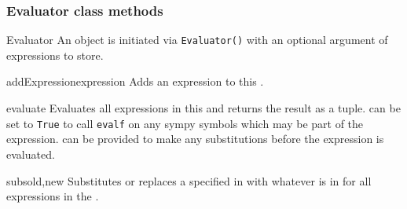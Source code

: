 \subsubsection{Evaluator class methods}
\begin{classdesc}{Evaluator}{}
An \EVALUATOR object is initiated via \texttt{Evaluator()} with an optional
argument of expressions to store.
\end{classdesc}
\begin{methoddesc}[Evaluator]{addExpression}{expression}
Adds an expression to this \EVALUATOR.
\end{methoddesc}
\begin{methoddesc}[Evaluator]{evaluate}{}
Evaluates all expressions in this \EVALUATOR and returns the result as a tuple.
 can be set to \texttt{True} to call \texttt{evalf} on any sympy
symbols which may be part of the expression.
 can be provided to make any substitutions before the expression
is evaluated.
\end{methoddesc}
\begin{methoddesc}[Evaluator]{subs}{old,new}
Substitutes or replaces a \SYMBOL specified in  with whatever is
in  for all expressions in the \EVALUATOR.
\end{methoddesc}

